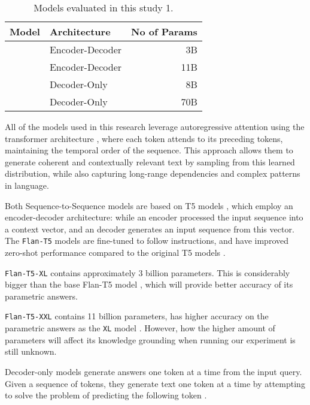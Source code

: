 \begin{table}[b]
	\centering
	\footnotesize
	\begin{tabular}{p{100pt} l r}
		\toprule
			Model             & Architecture    & No of Params \\
		\midrule
			\smallflan{}      & Encoder-Decoder & 3B          \\[5pt]
			\bigflan{}        & Encoder-Decoder & 11B         \\[5pt]
			\llamaparbox{}    & Decoder-Only    & 8B          \\[10pt]
			\bigllamaparbox{} & Decoder-Only    & 70B         \\[10pt]
		\bottomrule
	\end{tabular}
	\caption{Models evaluated in this study 1.}
	\label{model_list}
\end{table}

All of the models used in this research leverage autoregressive attention using the transformer architecture \cite{attention_is_all_you_need}, where each token attends to its preceding tokens, maintaining the temporal order of the sequence.
This approach allows them to generate coherent and contextually relevant text by sampling from this learned distribution, while also capturing long-range dependencies and complex patterns in language.

Both Sequence-to-Sequence models are based on T5 models \cite{t5}, which employ an encoder-decoder architecture: while an encoder processed the input sequence into a context vector, and an decoder generates an input sequence from this vector.
The \texttt{Flan-T5} models are fine-tuned to follow instructions, and have improved zero-shot performance compared to the original T5 models \cite{flant5}.

\texttt{Flan-T5-XL} contains approximately 3 billion parameters.
This is considerably bigger than the base Flan-T5 model \cite{flant5}, which will provide better accuracy of its parametric answers.

\texttt{Flan-T5-XXL} contains 11 billion parameters, has higher accuracy on the parametric answers as the \texttt{XL} model \cite{flant5}.
However, how the higher amount of parameters will affect its knowledge grounding when running our experiment is still unknown.

Decoder-only models generate answers one token at a time from the input query.
Given a sequence of tokens, they generate text one token at a time by attempting to solve the problem of predicting the following token \cite{gpt}.

